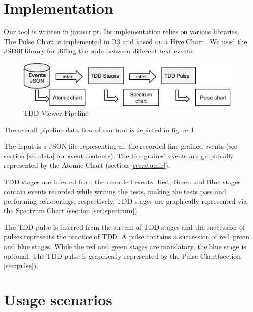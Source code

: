 \documentclass[journal]{vgtc}                %
\begin{document}
\section{Implementation}

Our tool is written in javascript.
Its implementation relies on various libraries.
The Pulse Chart is implemented in D3 \cite{three} and based on a Hive Chart \cite{four}.
We used the JSDiff library \cite{five} for diffing the code between different text events.

\begin{figure}[H]
	\includegraphics[width=\columnwidth]{implementation}
	\caption{TDD Viewer Pipeline}
	\label{fig:tool_pipeline}
\end{figure}

The overall pipeline data flow of our tool is depicted in figure \ref{fig:tool_pipeline}.

The input is a JSON file representing all the recorded fine grained events (see section \ref{sec:data} for event contents).
The fine grained events are graphically represented by the Atomic Chart (section \ref{sec:atomic}).

TDD stages are inferred from the recorded events.
Red, Green and Blue stages contain events recorded while writing the tests, making the tests pass and performing refactorings, respectively.
TDD stages are graphically represented via the Spectrum Chart (section \ref{sec:spectrum}).

The TDD pulse is inferred from the stream of TDD stages and the succession of pulses represents the practice of TDD.
A pulse contains a succession of red, green and blue stages.
While the red and green stages are mandatory, the blue stage is optional.
The TDD pulse is graphically represented by the Pulse Chart(section \ref{sec:pulse}).

\section{Usage scenarios}
\end{document}
